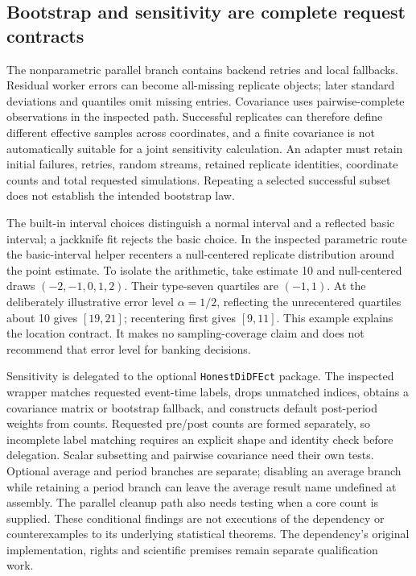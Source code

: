 \subsection{Bootstrap and sensitivity are complete request contracts}
The nonparametric parallel branch contains backend retries and local
fallbacks. Residual worker errors can become all-missing replicate objects;
later standard deviations and quantiles omit missing entries. Covariance
uses pairwise-complete observations in the inspected path. Successful
replicates can therefore define different effective samples across
coordinates, and a finite covariance is not automatically suitable for a
joint sensitivity calculation. An adapter must retain initial failures,
retries, random streams, retained replicate identities, coordinate counts
and total requested simulations. Repeating a selected successful subset
does not establish the intended bootstrap law.~\citep{exec24_fect_source}

The built-in interval choices distinguish a normal interval and a reflected
basic interval; a jackknife fit rejects the basic choice. In the inspected
parametric route the basic-interval helper recenters a null-centered
replicate distribution around the point estimate. To isolate the arithmetic,
take estimate 10 and null-centered draws $(-2,-1,0,1,2)$. Their type-seven
quartiles are $(-1,1)$. At the deliberately illustrative error level
$\alpha=1/2$, reflecting the unrecentered quartiles about 10 gives
$[19,21]$; recentering first gives $[9,11]$. This example explains the
location contract. It makes no sampling-coverage claim and does not
recommend that error level for banking decisions.
\citep{exec24_fect_source,exec24_fect_choice}

Sensitivity is delegated to the optional \texttt{HonestDiDFEct} package.
The inspected wrapper matches requested event-time labels, drops unmatched
indices, obtains a covariance matrix or bootstrap fallback, and constructs
default post-period weights from counts. Requested pre/post counts are
formed separately, so incomplete label matching requires an explicit
shape and identity check before delegation. Scalar subsetting and
pairwise covariance need their own tests. Optional average and period
branches are separate; disabling an average branch while retaining a
period branch can leave the average result name undefined at assembly.
The parallel cleanup path also needs testing when a core count is supplied.
These conditional findings are not executions of the dependency or
counterexamples to its underlying statistical theorems. The dependency's
original implementation, rights and scientific premises remain separate
qualification work.~\citep{exec24_fect_source,exec24_fect_choice}

